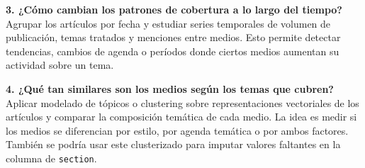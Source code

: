 \documentclass[a4paper,11pt]{article}
\begin{document}
\textbf{3. ¿Cómo cambian los patrones de cobertura a lo largo del tiempo?} Agrupar los artículos por fecha y estudiar series temporales de volumen de publicación, temas tratados y menciones entre medios. Esto permite detectar tendencias, cambios de agenda o períodos donde ciertos medios aumentan su actividad sobre un tema.

\textbf{4. ¿Qué tan similares son los medios según los temas que cubren?} Aplicar modelado de tópicos o clustering sobre representaciones vectoriales de los artículos y comparar la composición temática de cada medio. La idea es medir si los medios se diferencian por estilo, por agenda temática o por ambos factores. También se podría usar este clusterizado para imputar valores faltantes en la columna de \texttt{section}.
\end{document}
